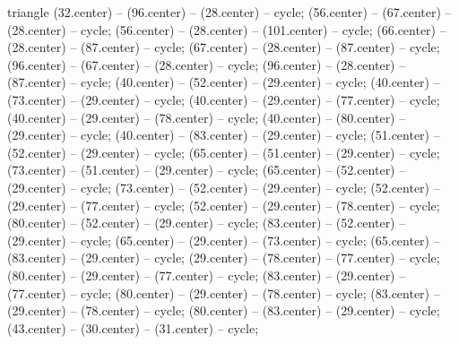 \begin{pgfonlayer}{triangle}
 (32.center) -- (96.center) -- (28.center) -- cycle; 
 (56.center) -- (67.center) -- (28.center) -- cycle; 
 (56.center) -- (28.center) -- (101.center) -- cycle; 
 (66.center) -- (28.center) -- (87.center) -- cycle; 
 (67.center) -- (28.center) -- (87.center) -- cycle; 
 (96.center) -- (67.center) -- (28.center) -- cycle; 
 (96.center) -- (28.center) -- (87.center) -- cycle; 
 (40.center) -- (52.center) -- (29.center) -- cycle; 
 (40.center) -- (73.center) -- (29.center) -- cycle; 
 (40.center) -- (29.center) -- (77.center) -- cycle; 
 (40.center) -- (29.center) -- (78.center) -- cycle; 
 (40.center) -- (80.center) -- (29.center) -- cycle; 
 (40.center) -- (83.center) -- (29.center) -- cycle; 
 (51.center) -- (52.center) -- (29.center) -- cycle; 
 (65.center) -- (51.center) -- (29.center) -- cycle; 
 (73.center) -- (51.center) -- (29.center) -- cycle; 
 (65.center) -- (52.center) -- (29.center) -- cycle; 
 (73.center) -- (52.center) -- (29.center) -- cycle; 
 (52.center) -- (29.center) -- (77.center) -- cycle; 
 (52.center) -- (29.center) -- (78.center) -- cycle; 
 (80.center) -- (52.center) -- (29.center) -- cycle; 
 (83.center) -- (52.center) -- (29.center) -- cycle; 
 (65.center) -- (29.center) -- (73.center) -- cycle; 
 (65.center) -- (83.center) -- (29.center) -- cycle; 
 (29.center) -- (78.center) -- (77.center) -- cycle; 
 (80.center) -- (29.center) -- (77.center) -- cycle; 
 (83.center) -- (29.center) -- (77.center) -- cycle; 
 (80.center) -- (29.center) -- (78.center) -- cycle; 
 (83.center) -- (29.center) -- (78.center) -- cycle; 
 (80.center) -- (83.center) -- (29.center) -- cycle; 
 (43.center) -- (30.center) -- (31.center) -- cycle; 

\end{pgfonlayer}
